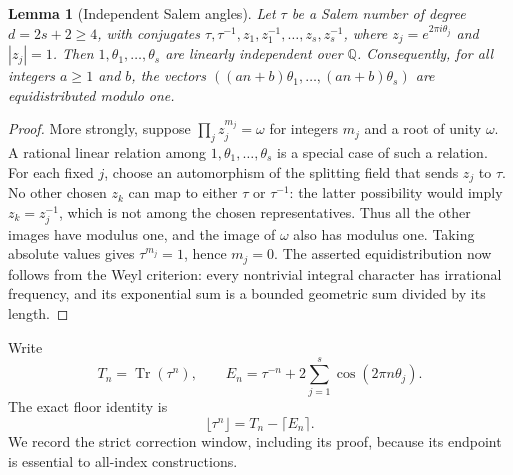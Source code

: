 \documentclass[11pt,a4paper]{article}
\newtheorem{lemma}[theorem]{Lemma}
\theoremstyle{definition}
\theoremstyle{remark}
\numberwithin{equation}{section}
\begin{document}
\begin{lemma}[Independent Salem angles]\label{tw:lem:salem-independent-angles}
Let $\tau$ be a Salem number of degree $d=2s+2\ge4$, with conjugates
$\tau,\tau^{-1},z_1,z_1^{-1},\ldots,z_s,z_s^{-1}$, where
$z_j=e^{2\pi i\theta_j}$ and $|z_j|=1$.  Then
$1,\theta_1,\ldots,\theta_s$ are linearly independent over $\mathbb Q$.
Consequently, for all integers $a\ge1$ and $b$, the vectors
$((an+b)\theta_1,\ldots,(an+b)\theta_s)$ are equidistributed modulo one.
\end{lemma}
\begin{proof}
More strongly, suppose $\prod_jz_j^{m_j}=\omega$ for integers $m_j$
and a root of unity $\omega$.  A rational linear relation among
$1,\theta_1,\ldots,\theta_s$ is a special case of such a relation.
For each fixed $j$, choose an automorphism of the splitting field that
sends $z_j$ to $\tau$.  No other chosen $z_k$ can map to either $\tau$ or
$\tau^{-1}$: the latter possibility would imply $z_k=z_j^{-1}$, which
is not among the chosen representatives.  Thus all the other images
have modulus one, and the image of $\omega$ also has modulus one.
Taking absolute values gives $\tau^{m_j}=1$, hence
$m_j=0$.  The asserted equidistribution now follows from the Weyl
criterion: every nontrivial integral character has irrational frequency,
and its exponential sum is a bounded geometric sum divided by its length.
\end{proof}

Write
\[
 T_n=\operatorname{Tr}(\tau^n),\qquad
 E_n=\tau^{-n}+2\sum_{j=1}^s\cos(2\pi n\theta_j).
\]
The exact floor identity is
\begin{equation}\label{tw:eq:sharp-floor-identity}
 \lfloor\tau^n\rfloor=T_n-\lceil E_n\rceil.
\end{equation}
We record the strict correction window, including its proof, because its
endpoint is essential to all-index constructions.
\end{document}
